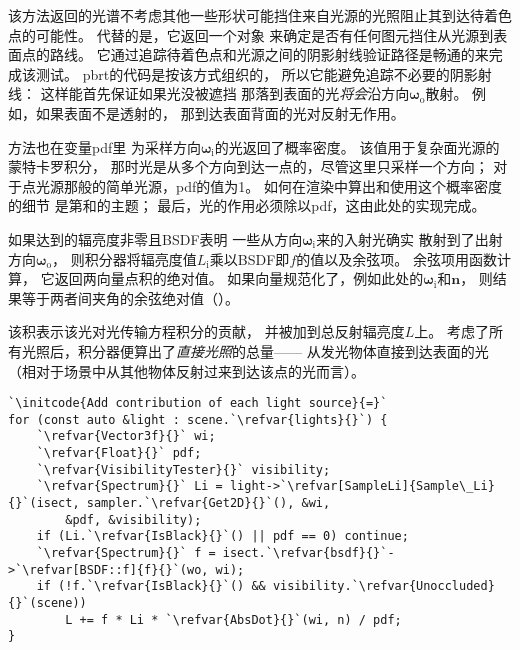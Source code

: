 该方法返回的光谱不考虑其他一些形状可能挡住来自光源的光照阻止其到达待着色点的可能性。
代替的是，它返回一个对象
来确定是否有任何图元挡住从光源到表面点的路线。
它通过追踪待着色点和光源之间的阴影射线验证路径是畅通的来完成该测试。
pbrt的代码是按该方式组织的，
所以它能避免追踪不必要的阴影射线：
这样能首先保证如果光没被遮挡
那落到表面的光\emph{将会}沿方向${\bm \omega}_\mathrm{o}$散射。
例如，如果表面不是透射的，
那到达表面背面的光对反射无作用。

方法也在变量{\ttfamily pdf}里
为采样方向${\bm \omega}_\mathrm{i}$的光返回了概率密度。
该值用于复杂面光源的蒙特卡罗积分，
那时光是从多个方向到达一点的，尽管这里只采样一个方向；
对于点光源那般的简单光源，{\ttfamily pdf}的值为1。
如何在渲染中算出和使用这个概率密度的细节
是第和的主题；
最后，光的作用必须除以{\ttfamily pdf}，这由此处的实现完成。

如果达到的辐亮度非零且BSDF表明
一些从方向${\bm \omega}_\mathrm{i}$来的入射光确实
散射到了出射方向${\bm \omega}_\mathrm{o}$，
则积分器将辐亮度值$L_\mathrm{i}$乘以BSDF即$f$的值以及余弦项。
余弦项用函数计算，
它返回两向量点积的绝对值。
如果向量规范化了，例如此处的${\bm \omega}_\mathrm{i}$和$\bm n$，
则结果等于两者间夹角的余弦绝对值（）。

该积表示该光对光传输方程积分的贡献，
并被加到总反射辐亮度$L$上。
考虑了所有光照后，积分器便算出了\emph{直接光照}的总量——
从发光物体直接到达表面的光
（相对于场景中从其他物体反射过来到达该点的光而言）。

\begin{lstlisting}
`\initcode{Add contribution of each light source}{=}`
for (const auto &light : scene.`\refvar{lights}{}`) {
    `\refvar{Vector3f}{}` wi;
    `\refvar{Float}{}` pdf;
    `\refvar{VisibilityTester}{}` visibility;
    `\refvar{Spectrum}{}` Li = light->`\refvar[SampleLi]{Sample\_Li}{}`(isect, sampler.`\refvar{Get2D}{}`(), &wi,
        &pdf, &visibility);
    if (Li.`\refvar{IsBlack}{}`() || pdf == 0) continue;
    `\refvar{Spectrum}{}` f = isect.`\refvar{bsdf}{}`->`\refvar[BSDF::f]{f}{}`(wo, wi);
    if (!f.`\refvar{IsBlack}{}`() && visibility.`\refvar{Unoccluded}{}`(scene))
        L += f * Li * `\refvar{AbsDot}{}`(wi, n) / pdf;
}
\end{lstlisting}

